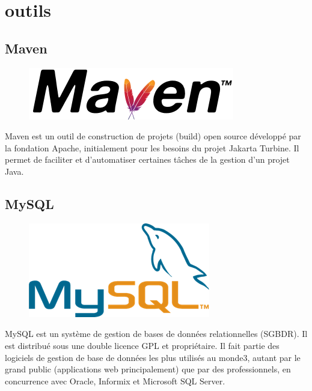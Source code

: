 \documentclass[12pt,a4paper]{report}
\begin{document}
		
	\section{outils}
		\subsection{Maven}
		\begin{figure}
		\includegraphics[scale=0.3]{./graphics/maven.png}
		\end{figure}
		Maven est un outil de construction de projets (build) open source développé par la fondation Apache, initialement pour les besoins du projet Jakarta Turbine. Il permet de faciliter et d'automatiser certaines tâches de la gestion d'un projet Java.\\

		\subsection{MySQL}
		\begin{figure}
		\includegraphics[scale=0.3]{./graphics/mysql.png}
		\end{figure}
		MySQL est un système de gestion de bases de données relationnelles (SGBDR). Il est distribué sous une double licence GPL et propriétaire. Il fait partie des logiciels de gestion de base de données les plus utilisés au monde3, autant par le grand public (applications web principalement) que par des professionnels, en concurrence avec Oracle, Informix et Microsoft SQL Server.\\
\end{document}
